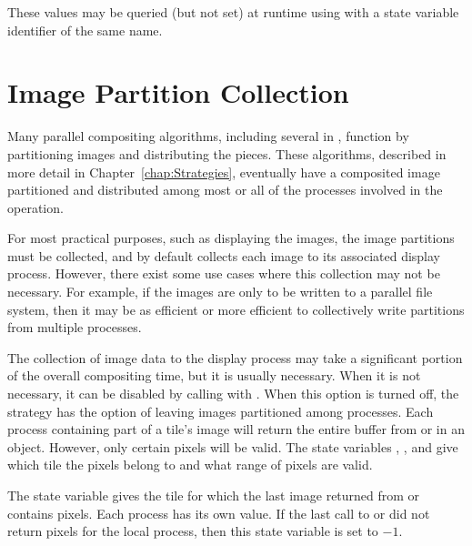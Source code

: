 These values may be queried (but not set) at runtime using 
with a state variable identifier of the same name.


\section{Image Partition Collection}
\label{sec:Customizing_Compositing:Image_Collection}

Many parallel compositing algorithms, including several in \IceT, function
by partitioning images and distributing the pieces.  These algorithms,
described in more detail in Chapter~\ref{chap:Strategies}, eventually have
a composited image partitioned and distributed among most or all of the
processes involved in the operation.

For most practical purposes, such as displaying the images, the image
partitions must be collected, and by default \IceT collects each image to
its associated display process.  However, there exist some use cases where
this collection may not be necessary.  For example, if the images are only
to be written to a parallel file system, then it may be as efficient or
more efficient to collectively write partitions from multiple processes.

The collection of image data to the display process may take a significant
portion of the overall compositing time, but it is usually necessary.  When
it is not necessary, it can be disabled by calling  with
.  When this option is turned off, the
strategy has the option of leaving images partitioned among processes.  Each
process containing part of a tile's image will return the entire buffer
from  or  in an
 object.  However, only certain pixels will be valid.  The
state variables ,
, and 
give which tile the pixels belong to and what range of pixels are valid.

The  state variable gives the tile for
which the last image returned from  or
 contains pixels.  Each process has its own value.
If the last call to  or  did
not return pixels for the local process, then this state variable is set to
$-1$.

